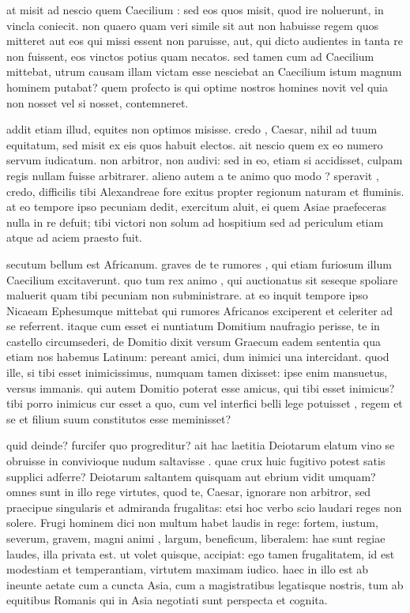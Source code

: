  at misit ad nescio quem Caecilium : sed eos quos misit, quod ire noluerunt, in vincla coniecit. non quaero quam veri simile sit aut non habuisse regem quos mitteret aut eos qui missi essent non paruisse, aut, qui dicto audientes in tanta re non fuissent, eos vinctos potius quam necatos. sed tamen cum ad Caecilium mittebat, utrum causam illam victam esse nesciebat an Caecilium istum magnum hominem putabat? quem profecto is qui optime nostros homines novit vel quia non nosset vel si nosset, contemneret.

 addit etiam illud, equites non optimos misisse. credo , Caesar, nihil ad tuum equitatum, sed misit ex eis quos habuit electos. ait nescio quem ex eo numero servum iudicatum. non arbitror, non audivi: sed in eo, etiam si accidisset, culpam regis nullam fuisse arbitrarer. alieno autem a te animo quo modo ? speravit , credo, difficilis tibi Alexandreae fore exitus propter regionum naturam et fluminis. at eo tempore ipso pecuniam dedit, exercitum aluit, ei quem Asiae praefeceras nulla in re defuit; tibi victori non solum ad hospitium sed ad periculum etiam atque ad aciem praesto fuit.

 secutum bellum est Africanum. graves de te rumores , qui etiam furiosum illum Caecilium excitaverunt. quo tum rex animo , qui auctionatus sit seseque spoliare maluerit quam tibi pecuniam non subministrare. at eo inquit tempore ipso Nicaeam Ephesumque mittebat qui rumores Africanos exciperent et celeriter ad se referrent. itaque cum esset ei nuntiatum Domitium naufragio perisse, te in castello circumsederi, de Domitio dixit versum Graecum eadem sententia qua etiam nos habemus Latinum: pereant amici, dum inimici una intercidant. quod ille, si tibi esset inimicissimus, numquam tamen dixisset: ipse enim mansuetus, versus immanis. qui autem Domitio poterat esse amicus, qui tibi esset inimicus? tibi porro inimicus cur esset a quo, cum vel interfici belli lege potuisset , regem et se et filium suum constitutos esse meminisset?

 quid deinde? furcifer quo progreditur? ait hac laetitia Deiotarum elatum vino se obruisse in convivioque nudum saltavisse . quae crux huic fugitivo potest satis supplici adferre? Deiotarum saltantem quisquam aut ebrium vidit umquam? omnes sunt in illo rege virtutes, quod te, Caesar, ignorare non arbitror, sed praecipue singularis et admiranda frugalitas: etsi hoc verbo scio laudari reges non solere. Frugi hominem dici non multum habet laudis in rege: fortem, iustum, severum, gravem, magni animi , largum, beneficum, liberalem: hae sunt regiae laudes, illa privata est. ut volet quisque, accipiat: ego tamen frugalitatem, id est modestiam et temperantiam, virtutem maximam iudico. haec in illo est ab ineunte aetate cum a cuncta Asia, cum a magistratibus legatisque nostris, tum ab equitibus Romanis qui in Asia negotiati sunt perspecta et cognita.

